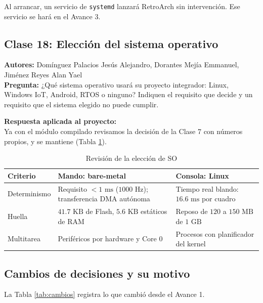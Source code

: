 \documentclass[conference]{IEEEtran}
\begin{document}
Al arrancar, un servicio de \texttt{systemd} lanzará RetroArch sin intervención. Ese servicio se hará en el Avance 3.

\subsection{Clase 18: Elección del sistema operativo}
\textbf{Autores:} Domínguez Palacios Jesús Alejandro, Dorantes Mejía Emmanuel, Jiménez Reyes Alan Yael \\
\textbf{Pregunta:} ¿Qué sistema operativo usará su proyecto integrador: Linux, Windows IoT, Android, RTOS o ninguno? Indiquen el requisito que decide y un requisito que el sistema elegido no puede cumplir.

\textbf{Respuesta aplicada al proyecto:} \\
Ya con el módulo compilado revisamos la decisión de la Clase 7 con números propios, y se mantiene (Tabla \ref{tab:eleccion_so}).

\begin{table}[H]
    \centering
    \caption{Revisión de la elección de SO}
    \label{tab:eleccion_so}
    \small
    \begin{tabular}{|p{1.8cm}|p{2.75cm}|p{2.75cm}|}
        \hline
        \textbf{Criterio} & \textbf{Mando: bare-metal} & \textbf{Consola: Linux} \\
        \hline
        Determinismo & Requisito $<1\text{ ms}$ ($1000\text{ Hz}$); transferencia DMA autónoma & Tiempo real blando: $16.6\text{ ms}$ por cuadro \\
        \hline
        Huella & $41.7\text{ KB}$ de Flash, $5.6\text{ KB}$ estáticos de RAM & Reposo de $120$ a $150\text{ MB}$ de $1\text{ GB}$ \\
        \hline
        Multitarea & Periféricos por hardware y Core 0 & Procesos con planificador del kernel \\
        \hline
    \end{tabular}
\end{table}

\subsection{Cambios de decisiones y su motivo}

La Tabla \ref{tab:cambios} registra lo que cambió desde el Avance 1.
\end{document}
